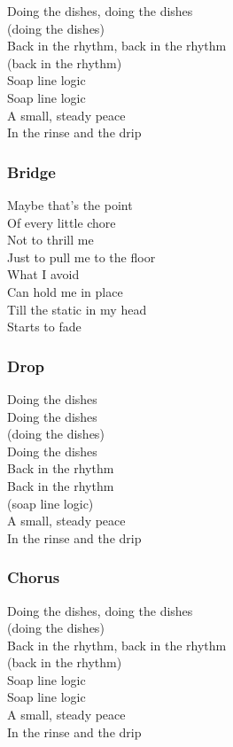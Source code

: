 Doing the dishes, doing the dishes\\
(doing the dishes)\\
Back in the rhythm, back in the rhythm\\
(back in the rhythm)\\
Soap line logic\\
Soap line logic\\
A small, steady peace\\
In the rinse and the drip

\subsubsection{Bridge}\label{bridge-20}

Maybe that's the point\\
Of every little chore\\
Not to thrill me\\
Just to pull me to the floor\\
What I avoid\\
Can hold me in place\\
Till the static in my head\\
Starts to fade

\subsubsection{Drop}\label{drop}

Doing the dishes\\
Doing the dishes\\
(doing the dishes)\\
Doing the dishes\\
Back in the rhythm\\
Back in the rhythm\\
(soap line logic)\\
A small, steady peace\\
In the rinse and the drip

\subsubsection{Chorus}\label{chorus-66}

Doing the dishes, doing the dishes\\
(doing the dishes)\\
Back in the rhythm, back in the rhythm\\
(back in the rhythm)\\
Soap line logic\\
Soap line logic\\
A small, steady peace\\
In the rinse and the drip

